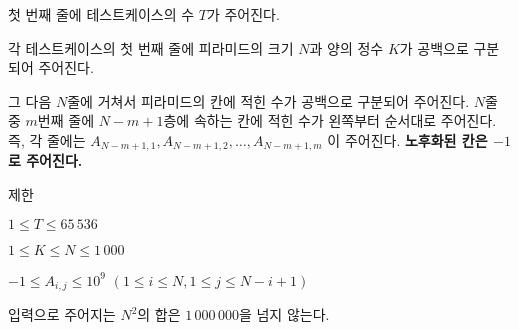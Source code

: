 첫 번째 줄에 테스트케이스의 수 $T$가 주어진다.

각 테스트케이스의 첫 번째 줄에 피라미드의 크기 $N$과 양의 정수 $K$가 공백으로 구분되어 주어진다.

그 다음 $N$줄에 거쳐서 피라미드의 칸에 적힌 수가 공백으로 구분되어 주어진다. $N$줄 중 $m$번째 줄에 $N-m+1$층에 속하는 칸에 적힌 수가 왼쪽부터 순서대로 주어진다. 즉, 각 줄에는 $A_{N-m+1,1},A_{N-m+1,2}, \dots ,A_{N-m+1,m}$ 이 주어진다. \textbf{노후화된 칸은 $-1$로 주어진다.}

제한

$1 \le T \le 65\,536$

$1 \le K \le N \le 1\,000$

$-1 \le A_{i,j} \le 10^9$ $(1 \le i \le N, 1 \le j \le N-i+1)$ 

입력으로 주어지는 $N^2$의 합은 $1\,000\,000$을 넘지 않는다.  
